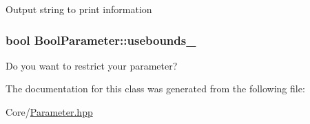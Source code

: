 Output string to print information \hypertarget{class_bool_parameter_a16c8c857c4c9cd45714e7858b41f55f2}{
\subsubsection[{usebounds\-\_\-}]{\setlength{\rightskip}{0pt plus 5cm}bool Bool\-Parameter\-::usebounds\-\_\-\hspace{0.3cm}{\ttfamily [protected]}}}\label{class_bool_parameter_a16c8c857c4c9cd45714e7858b41f55f2}
Do you want to restrict your parameter? 

The documentation for this class was generated from the following file\-:\begin{DoxyCompactItemize}
\item 
Core/\hyperlink{_parameter_8hpp}{Parameter.\-hpp}\end{DoxyCompactItemize}
